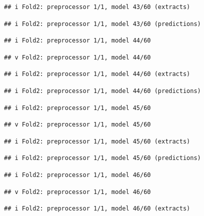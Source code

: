 \documentclass[
]{article}
\begin{document}
\begin{verbatim}
## i Fold2: preprocessor 1/1, model 43/60 (extracts)
\end{verbatim}

\begin{verbatim}
## i Fold2: preprocessor 1/1, model 43/60 (predictions)
\end{verbatim}

\begin{verbatim}
## i Fold2: preprocessor 1/1, model 44/60
\end{verbatim}

\begin{verbatim}
## v Fold2: preprocessor 1/1, model 44/60
\end{verbatim}

\begin{verbatim}
## i Fold2: preprocessor 1/1, model 44/60 (extracts)
\end{verbatim}

\begin{verbatim}
## i Fold2: preprocessor 1/1, model 44/60 (predictions)
\end{verbatim}

\begin{verbatim}
## i Fold2: preprocessor 1/1, model 45/60
\end{verbatim}

\begin{verbatim}
## v Fold2: preprocessor 1/1, model 45/60
\end{verbatim}

\begin{verbatim}
## i Fold2: preprocessor 1/1, model 45/60 (extracts)
\end{verbatim}

\begin{verbatim}
## i Fold2: preprocessor 1/1, model 45/60 (predictions)
\end{verbatim}

\begin{verbatim}
## i Fold2: preprocessor 1/1, model 46/60
\end{verbatim}

\begin{verbatim}
## v Fold2: preprocessor 1/1, model 46/60
\end{verbatim}

\begin{verbatim}
## i Fold2: preprocessor 1/1, model 46/60 (extracts)
\end{verbatim}
\end{document}
